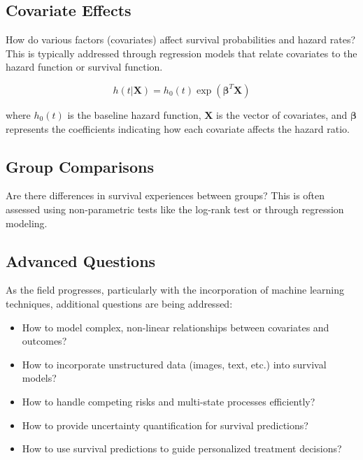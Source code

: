 \subsection{Covariate Effects}

How do various factors (covariates) affect survival probabilities and hazard rates? This is typically addressed through regression models that relate covariates to the hazard function or survival function.

\begin{equationbox}[title=Cox Proportional Hazards Model]
\begin{equation}
h(t|\mathbf{X}) = h_0(t) \exp(\boldsymbol{\beta}^T \mathbf{X})
\end{equation}

where $h_0(t)$ is the baseline hazard function, $\mathbf{X}$ is the vector of covariates, and $\boldsymbol{\beta}$ represents the coefficients indicating how each covariate affects the hazard ratio.
\end{equationbox}

\subsection{Group Comparisons}

Are there differences in survival experiences between groups? This is often assessed using non-parametric tests like the log-rank test or through regression modeling.

\subsection{Advanced Questions}

As the field progresses, particularly with the incorporation of machine learning techniques, additional questions are being addressed:

\begin{itemize}
    \item How to model complex, non-linear relationships between covariates and outcomes?
    \item How to incorporate unstructured data (images, text, etc.) into survival models?
    \item How to handle competing risks and multi-state processes efficiently?
    \item How to provide uncertainty quantification for survival predictions?
    \item How to use survival predictions to guide personalized treatment decisions?
\end{itemize}

